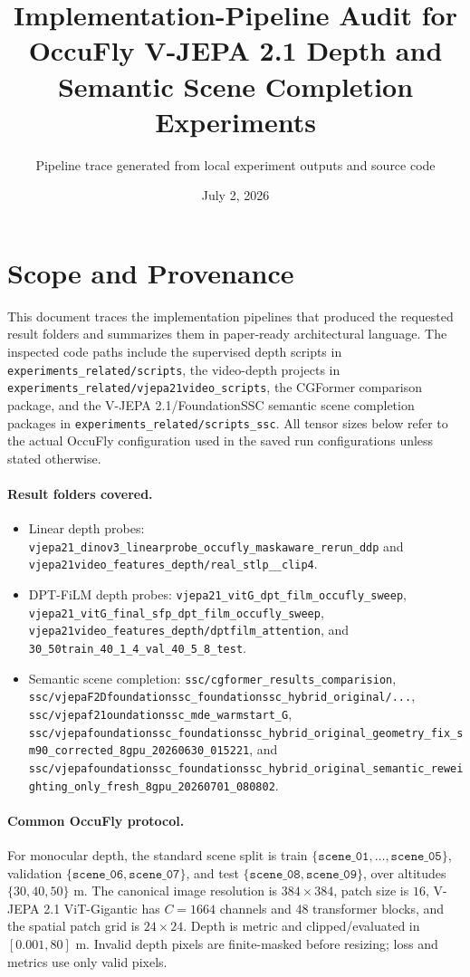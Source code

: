 \documentclass[10pt]{article}
\title{Implementation-Pipeline Audit for OccuFly V-JEPA 2.1 Depth and Semantic Scene Completion Experiments}
\author{Pipeline trace generated from local experiment outputs and source code}
\date{July 2, 2026}
\newcommand{\codepath}[1]{\begingroup\small\nolinkurl{#1}\endgroup}
\begin{document}
\maketitle

\section{Scope and Provenance}
This document traces the implementation pipelines that produced the requested result folders and summarizes them in paper-ready architectural language.  The inspected code paths include the supervised depth scripts in \codepath{experiments_related/scripts}, the video-depth projects in \codepath{experiments_related/vjepa21video_scripts}, the CGFormer comparison package, and the V-JEPA 2.1/FoundationSSC semantic scene completion packages in \codepath{experiments_related/scripts_ssc}.  All tensor sizes below refer to the actual OccuFly configuration used in the saved run configurations unless stated otherwise.

\paragraph{Result folders covered.}
\begin{itemize}[leftmargin=*]
  \item Linear depth probes: \codepath{vjepa21_dinov3_linearprobe_occufly_maskaware_rerun_ddp} and \codepath{vjepa21video_features_depth/real_stlp__clip4}.
  \item DPT-FiLM depth probes: \codepath{vjepa21_vitG_dpt_film_occufly_sweep}, \codepath{vjepa21_vitG_final_sfp_dpt_film_occufly_sweep}, \codepath{vjepa21video_features_depth/dptfilm_attention}, and \codepath{30_50train_40_1_4_val_40_5_8_test}.
  \item Semantic scene completion: \codepath{ssc/cgformer_results_comparision}, \codepath{ssc/vjepaF2Dfoundationssc_foundationssc_hybrid_original/...}, \codepath{ssc/vjepaf21oundationssc_mde_warmstart_G}, \codepath{ssc/vjepafoundationssc_foundationssc_hybrid_original_geometry_fix_sm90_corrected_8gpu_20260630_015221}, and \codepath{ssc/vjepafoundationssc_foundationssc_hybrid_original_semantic_reweighting_only_fresh_8gpu_20260701_080802}.
\end{itemize}

\paragraph{Common OccuFly protocol.}
For monocular depth, the standard scene split is train \(\{\texttt{scene\_01},\ldots,\texttt{scene\_05}\}\), validation \(\{\texttt{scene\_06},\texttt{scene\_07}\}\), and test \(\{\texttt{scene\_08},\texttt{scene\_09}\}\), over altitudes \(\{30,40,50\}\) m.  The canonical image resolution is \(384\times384\), patch size is \(16\), V-JEPA 2.1 ViT-Gigantic has \(C=1664\) channels and 48 transformer blocks, and the spatial patch grid is \(24\times24\).  Depth is metric and clipped/evaluated in \([0.001,80]\) m.  Invalid depth pixels are finite-masked before resizing; loss and metrics use only valid pixels.
\end{document}
